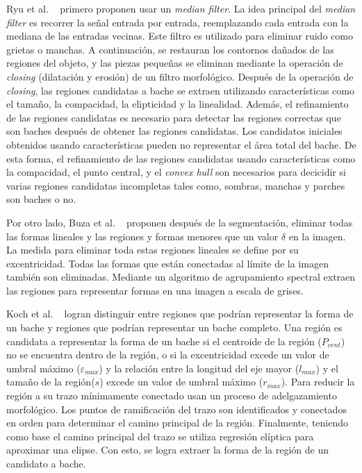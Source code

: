 		Ryu et al. ~ primero proponen usar un \emph{median filter}. La idea principal del \emph{median filter} es recorrer la señal 
		entrada por entrada, reemplazando cada entrada con la mediana de las entradas vecinas. Este filtro es utilizado para eliminar ruido como grietas o manchas. 
		A continuación, se restauran los contornos dañados de las regiones del objeto, y las piezas pequeñas se eliminan mediante la operación de \emph{closing}
		(dilatación y erosión) de un filtro morfológico. Después de la operación de \emph{closing}, las regiones candidatas a bache se extraen utilizando 
		características como el tamaño, la compacidad, la elipticidad y la linealidad. Además, el refinamiento de las regiones candidatas es necesario para detectar 
		las regiones correctas que son baches después de obtener las regiones candidatas. Los candidatos iniciales obtenidos usando características pueden no 
		representar el área total del bache. De esta forma, el refinamiento de las regiones candidatas usando características como la compacidad, el punto 
		central, y el \emph{convex hull} son necesarios para decicidir si varias regiones candidatas incompletas tales como, sombras, manchas y parches son baches o no.

		Por otro lado, Buza et al. ~ proponen después de la segmentación, eliminar todas las formas lineales  y las regiones y formas 
		menores que un valor $\delta$ en la imagen. La medida para eliminar toda estas regiones lineales se define por su excentricidad. Todas 
		las formas que están conectadas al límite de la imagen también son eliminadas. Mediante un algoritmo de agrupamiento spectral extraen 
		las regiones para representar formas en una imagen a escala de grises. 

		Koch et al. ~ logran distinguir entre regiones que podrían representar la forma de un bache y 
		regiones que podrían representar un bache completo. Una región es candidata a representar la forma de un bache si 
		el centroide de la región ($P_{cent}$) no se encuentra dentro de la región, o si la excentricidad excede un valor de umbral 
		máximo ($\varepsilon_{max}$) y la relación entre la longitud del eje mayor ($l_{max}$) y el tamaño de la región($s$) excede
		un valor de umbral máximo ($r_{max}$). Para reducir la región a su trazo  mínimamente conectado usan un proceso
		de adelgazamiento morfológico. Los puntos de ramificación del trazo son identificados y conectados en orden para 
		determinar el camino principal de la región. Finalmente, teniendo como base el camino principal del trazo 
		se utiliza regresión elíptica para aproximar una elipse. Con esto, se logra extraer la forma de la región de un 
		candidato a bache.

